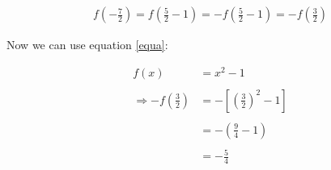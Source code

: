 \begin{enumerate}
\begin{equation}
\begin{split}
f\left(-\frac{7}{2}\right)=f\left(\frac{5}{2}-1\right)=-f\left(\frac{5}{2}-1\right)=-f\left(\frac{3}{2}\right)
\end{split}
\end{equation}

Now we can use equation \ref{equa}:

\begin{equation}
\begin{split}
f(x)&=x^2-1 \\
\\
\Rightarrow -f\left(\frac{3}{2}\right)&=-\left[ \left(\frac{3}{2}\right)^2-1\right]\\
\\
&=-\left(\frac{9}{4}-1\right) \\
\\
&=-\frac{5}{4}
\end{split}
\end{equation}

\end{enumerate}
